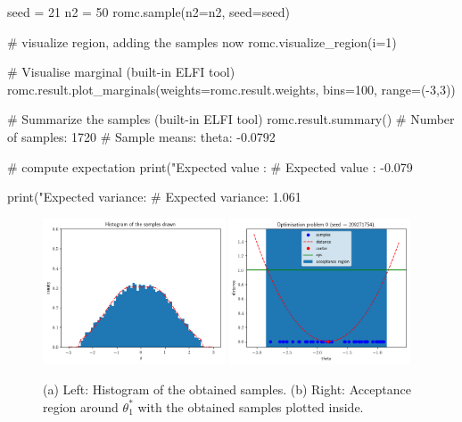 \begin{pythoncode}
  seed = 21
  n2 = 50
  romc.sample(n2=n2, seed=seed)

  # visualize region, adding the samples now
  romc.visualize_region(i=1)

  # Visualise marginal (built-in ELFI tool)
  romc.result.plot_marginals(weights=romc.result.weights, bins=100, range=(-3,3))

  # Summarize the samples (built-in ELFI tool)
  romc.result.summary()
  # Number of samples: 1720
  # Sample means: theta: -0.0792

  # compute expectation
  print("Expected value   : %
  # Expected value   : -0.079

  print("Expected variance: %
  # Expected variance: 1.061
\end{pythoncode}

\begin{figure}[h]
    \begin{center}
      \includegraphics[width=0.48\textwidth]{./latex_files/images/chapter3/example_marginal.png}
      \includegraphics[width=0.48\textwidth]{./latex_files/images/chapter3/example_region_samples.png}
    \end{center}
  \caption[Histogram of the obtained samples at the 1D example.]{(a) Left: Histogram of the obtained samples. (b) Right: Acceptance region around $\theta_1^*$ with the obtained samples plotted inside.}
  \label{fig:example_sampling}
\end{figure}

